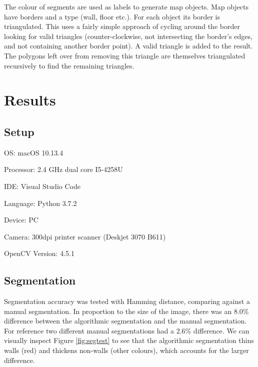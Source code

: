 \documentclass[11pt]{IEEEtran}
\begin{document}
The colour of segments are used as labels to generate map objects. Map objects have borders and a type (wall, floor etc.). For each object its border is triangulated. This uses a fairly simple approach of cycling around the border looking for valid triangles (counter-clockwise, not intersecting the border's edges, and not containing another border point). A valid triangle is added to the result. The polygons left over from removing this triangle are themselves triangulated recursively to find the remaining triangles. 


\section{Results}

\subsection{Setup}
OS: macOS 10.13.4

Processor: 2.4 GHz dual core I5-4258U

IDE: Visual Studio Code

Language: Python 3.7.2

Device: PC

Camera: 300dpi printer scanner (Deskjet 3070 B611)

OpenCV Version: 4.5.1

\subsection{Segmentation}

Segmentation accuracy was tested with Hamming distance, comparing against a manual segmentation. In proportion to the size of the image, there was an 8.0\% difference between the algorithmic segmentation and the manual segmentation. For reference two different manual segmentations had a 2.6\% difference. We can visually inspect Figure \ref{fig:segtest} to see that the algorithmic segmentation thins walls (red) and thickens non-walls (other colours), which accounts for the larger difference.
\end{document}
